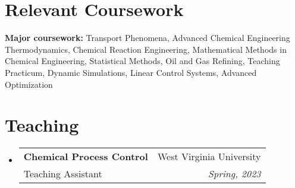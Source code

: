 \documentclass[letterpaper,11pt]{article}
\makeatletter
\newcommand{\resumeTeachingHeading}[4]{
	 \vspace{-2pt}\item
	\begin{tabular*}{0.97\textwidth}[t]{l@{\extracolsep{\fill}}r}
		\textbf{#1} & #2 \\
		{#3} & \textit{\small #4} \\
	\end{tabular*}\vspace{-7pt}
}
\newcommand{\resumeOrganizationHeading}[4]{
  \vspace{-2pt}\item
    \begin{tabular*}{0.97\textwidth}[t]{l@{\extracolsep{\fill}}r}
      \textbf{#1} & \textit{\small #2} \\
      \textit{\small#3}
    \end{tabular*}\vspace{-7pt}
}
\newcommand{\resumeSubHeadingListStart}{\begin{itemize}[leftmargin=0.15in, label={}]}
\newcommand{\resumeSubHeadingListEnd}{\end{itemize}}
\makeatother
\begin{document}
\setlength{\bibhang}{3pt}
{\list
	{}
	{\setlength{\leftmargin}{\bibhang}%
		\setlength{\itemindent}{-\leftmargin}%
		\setlength{\itemsep}{\bibitemsep}%
		\setlength{\parsep}{\bibparsep}}}
{\endlist}
{\item}
\nocite{*}
\printbibliography[env = bibliography, title= Selected Research Publications]


\section{Relevant Coursework}
  \vspace{2pt}
  \resumeSubHeadingListStart
    \small{\item{
        \textbf{Major coursework:}{ Transport Phenomena, Advanced Chemical Engineering Thermodynamics, Chemical Reaction Engineering, Mathematical Methods in Chemical Engineering, Statistical Methods, Oil and Gas Refining, Teaching Practicum, Dynamic Simulations, Linear Control Systems, Advanced Optimization} \\ \vspace{3pt}
        
    }}
  \resumeSubHeadingListEnd


  \section{Teaching}
  \vspace{3pt}
  \resumeSubHeadingListStart
  \resumeTeachingHeading{Chemical Process Control}{West Virginia University}{Teaching Assistant}{Spring, 2023}
  
\resumeSubHeadingListEnd


    
    



\end{document}
